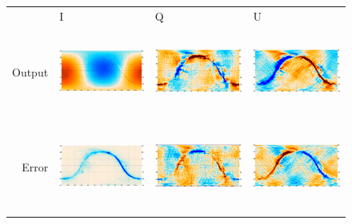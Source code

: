 \documentclass{article}
\begin{document}
\begin{figure}
	\centering
	\hspace*{-15mm}\begin{tabular}{rm{56mm}m{54.4mm}m{56mm}}
		& \hspace{32mm}I & \hspace{32mm}Q & \hspace{32mm}U \\
		Output &
		\includegraphics[height=28mm,clip,trim=0 8mm 7.5mm 0]{plots/std_sb_map_0.png} &
		\includegraphics[height=28mm,clip,trim=7.5mm 8mm 7.5mm 0]{plots/std_sb_map_1.png} &
		\includegraphics[height=28mm,clip,trim=7.5mm 8mm 0 0]{plots/std_sb_map_2.png} \\
		Error &
		\includegraphics[height=29.7mm,clip,trim=0 0 7.5mm 0]{plots/std_sb_diff_0.png} &
		\includegraphics[height=29.7mm,clip,trim=7.5mm 0 7.5mm 0]{plots/std_sb_diff_1.png} &
		\includegraphics[height=29.7mm,clip,trim=7.5mm 0 0 0]{plots/std_sb_diff_2.png}

\end{tabular}
\end{figure}
\end{document}
